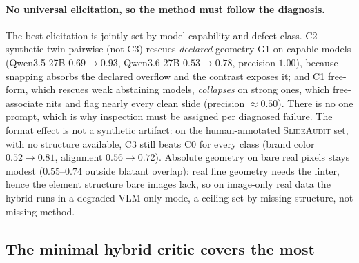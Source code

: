 \documentclass[10pt]{article}
\newcommand{\g}[1]{\textsf{#1}}        %
\begin{document}
\paragraph{No universal elicitation, so the method must follow the diagnosis.}
The best elicitation is jointly set by model capability and defect class. C2 synthetic-twin pairwise (not
C3) rescues \emph{declared} geometry \g{G1} on capable models (Qwen3.5-27B $0.69\!\to\!0.93$, Qwen3.6-27B
$0.53\!\to\!0.78$, precision $1.00$), because snapping absorbs the declared overflow and the contrast exposes
it; and C1 free-form, which rescues weak abstaining models, \emph{collapses} on strong ones, which
free-associate nits and flag nearly every clean slide (precision $\approx0.50$). There is no one prompt, which
is why inspection must be assigned per diagnosed failure. The format effect is not a synthetic artifact: on the
human-annotated \textsc{SlideAudit} set, with no structure available, C3 still beats C0 for every class (brand
color $0.52\!\to\!0.81$, alignment $0.56\!\to\!0.72$). Absolute geometry on bare real pixels stays modest
($0.55$--$0.74$ outside blatant overlap): real fine geometry needs the linter, hence the element structure bare
images lack, so on image-only real data the hybrid runs in a degraded VLM-only mode, a ceiling set by missing
structure, not missing method.

\subsection{The minimal hybrid critic covers the most}\label{sec:coverage}
\end{document}

